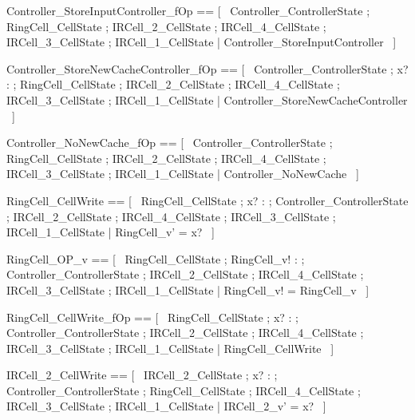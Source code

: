 \documentclass{article}
\begin{document}
\begin{zed}
	Controller\_StoreInputController\_fOp == [~  \Xi Controller\_ControllerState ; \Xi RingCell\_CellState ; \Xi IRCell\_2\_CellState ; \Xi IRCell\_4\_CellState ; \Xi IRCell\_3\_CellState ; \Xi IRCell\_1\_CellState | \lnot \pre Controller\_StoreInputController  ~]
\end{zed}

\begin{zed}
	Controller\_StoreNewCacheController\_fOp == [~  \Xi Controller\_ControllerState ; x? : \nat ; \Xi RingCell\_CellState ; \Xi IRCell\_2\_CellState ; \Xi IRCell\_4\_CellState ; \Xi IRCell\_3\_CellState ; \Xi IRCell\_1\_CellState | \lnot \pre Controller\_StoreNewCacheController  ~]
\end{zed}

\begin{zed}
	Controller\_NoNewCache\_fOp == [~  \Xi Controller\_ControllerState ; \Xi RingCell\_CellState ; \Xi IRCell\_2\_CellState ; \Xi IRCell\_4\_CellState ; \Xi IRCell\_3\_CellState ; \Xi IRCell\_1\_CellState | \lnot \pre Controller\_NoNewCache  ~]
\end{zed}

\begin{zed}
	RingCell\_CellWrite == [~  \Delta RingCell\_CellState ; x? : \nat ; \Xi Controller\_ControllerState ; \Xi IRCell\_2\_CellState ; \Xi IRCell\_4\_CellState ; \Xi IRCell\_3\_CellState ; \Xi IRCell\_1\_CellState | RingCell\_v' = x?  ~]
\end{zed}

\begin{zed}
	RingCell\_OP\_v == [~  \Xi RingCell\_CellState ; RingCell\_v! : \nat ; \Xi Controller\_ControllerState ; \Xi IRCell\_2\_CellState ; \Xi IRCell\_4\_CellState ; \Xi IRCell\_3\_CellState ; \Xi IRCell\_1\_CellState | RingCell\_v! = RingCell\_v  ~]
\end{zed}

\begin{zed}
	RingCell\_CellWrite\_fOp == [~  \Xi RingCell\_CellState ; x? : \nat ; \Xi Controller\_ControllerState ; \Xi IRCell\_2\_CellState ; \Xi IRCell\_4\_CellState ; \Xi IRCell\_3\_CellState ; \Xi IRCell\_1\_CellState | \lnot \pre RingCell\_CellWrite  ~]
\end{zed}

\begin{zed}
	IRCell\_2\_CellWrite == [~  \Delta IRCell\_2\_CellState ; x? : \nat ; \Xi Controller\_ControllerState ; \Xi RingCell\_CellState ; \Xi IRCell\_4\_CellState ; \Xi IRCell\_3\_CellState ; \Xi IRCell\_1\_CellState | IRCell\_2\_v' = x?  ~]
\end{zed}
\end{document}
